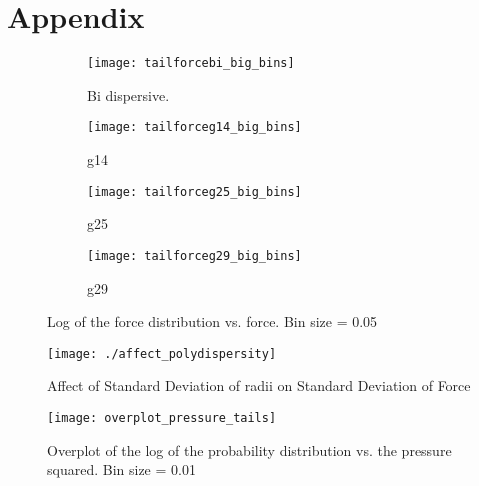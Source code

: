 \documentclass[12pt] {article} %
\begin{document}
\newpage

\section*{Appendix}  \label{appendix}

	
\begin{figure}[H]
	\centering
	\begin{subfigure}[h]{0.49\textwidth}
		\centering
		\texttt{[image: tailforcebi\_big\_bins]}
		\caption{Bi dispersive.}
		\label{fig:tailforcebi_big_bins_appendix}
	\end{subfigure}
		\hfill
	\begin{subfigure}[h]{0.49\textwidth}
		\centering
		\texttt{[image: tailforceg14\_big\_bins]}
		\caption{g14}
		\label{fig:tailforceg14_big_bins_appendix}
	\end{subfigure}
	\begin{subfigure}[h]{0.49\textwidth}
		\centering
		\texttt{[image: tailforceg25\_big\_bins]}
		\caption{g25}
		\label{fig:tailforceg25_big_bins_appendix}
	\end{subfigure}
	\begin{subfigure}[h]{0.49\textwidth}
		\centering
		\texttt{[image: tailforceg29\_big\_bins]}
		\caption{g29}
		\label{fig:tailforceg29_big_bins_appendix}
	\end{subfigure} 
	\caption{Log of the force distribution vs. force. Bin size = 0.05}
	\label{fig:tailforce_appendix}
\end{figure}

\begin{figure}[h]
	\centering
	\texttt{[image: ./affect\_polydispersity]}
	\caption{Affect of Standard Deviation of radii on Standard Deviation of Force}
	\label{fig:affect_polydispersity_appendix}
\end{figure}
	
		\begin{figure}[H]
						\centering
						\texttt{[image: overplot\_pressure\_tails]}
						\caption{Overplot of the log of the probability distribution vs. the pressure squared. Bin size = 0.01}
						\label{fig:overplot_pressure_tails}
					\end{figure}
	
\end{document}
